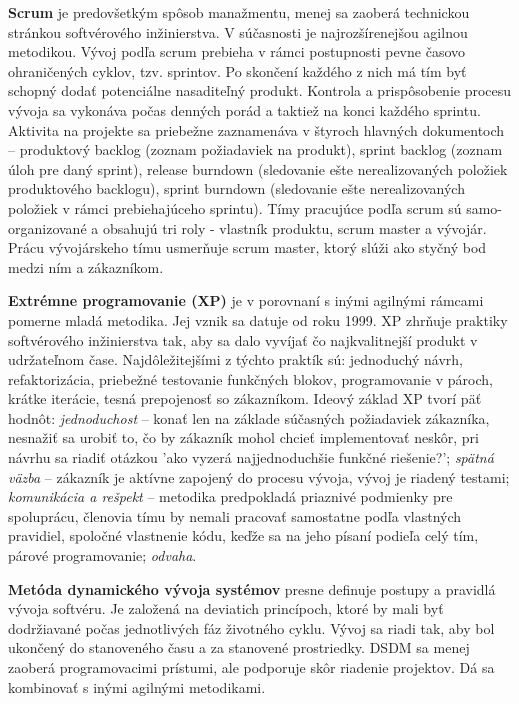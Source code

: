 \documentclass[10pt,twoside,slovak,a4paper]{article}
\begin{document}
\textbf{Scrum} je predovšetkým spôsob manažmentu, menej sa zaoberá technickou stránkou softvérového inžinierstva. V súčasnosti je najrozšírenejšou agilnou metodikou\cite{agile}. Vývoj podľa scrum prebieha v rámci postupnosti pevne časovo ohraničených cyklov, tzv. sprintov. Po skončení každého z nich má tím byť schopný dodať potenciálne nasaditeľný produkt. Kontrola a prispôsobenie procesu vývoja sa vykonáva počas denných porád a taktiež na konci každého sprintu. Aktivita na projekte sa priebežne zaznamenáva v štyroch hlavných dokumentoch – produktový backlog (zoznam požiadaviek na produkt), sprint backlog (zoznam úloh pre daný sprint), release burndown (sledovanie ešte nerealizovaných položiek produktového backlogu), sprint burndown (sledovanie ešte nerealizovaných položiek v rámci prebiehajúceho sprintu).
Tímy pracujúce podľa scrum sú samo-organizované a obsahujú tri roly - vlastník produktu, scrum master a vývojár. Prácu vývojárskeho tímu usmerňuje scrum master, ktorý slúži ako styčný bod medzi ním a zákazníkom\cite{scrum}.

\textbf{Extrémne programovanie (XP)} je v porovnaní s inými agilnými rámcami pomerne mladá metodika. Jej vznik sa datuje od roku 1999. XP zhrňuje praktiky softvérového inžinierstva tak, aby sa dalo vyvíjať čo najkvalitnejší produkt v udržateľnom čase. Najdôležitejšími z týchto praktík sú: jednoduchý návrh, refaktorizácia, priebežné testovanie funkčných blokov, programovanie v pároch, krátke iterácie, tesná prepojenosť so zákazníkom. Ideový základ XP tvorí päť hodnôt: \emph{jednoduchost} – konať len na základe súčasných požiadaviek zákazníka, nesnažiť sa urobiť to, čo by zákazník mohol chcieť implementovať neskôr, pri návrhu sa riadiť otázkou 'ako vyzerá najjednoduchšie funkčné riešenie?'; \emph{spätná väzba} – zákazník je aktívne zapojený do procesu vývoja, vývoj je riadený testami; \emph{komunikácia a rešpekt} – metodika predpokladá priaznivé podmienky pre spoluprácu, členovia tímu by nemali pracovať samostatne podľa vlastných pravidiel, spoločné vlastnenie kódu, keďže sa na jeho písaní podieľa celý tím, párové programovanie; \emph{odvaha}.

\textbf{Metóda dynamického vývoja systémov} presne definuje postupy a pravidlá vývoja softvéru. Je založená na deviatich princípoch, ktoré by mali byť dodržiavané počas jednotlivých fáz životného cyklu. Vývoj sa riadi tak, aby bol ukončený do stanoveného času a za stanovené prostriedky. DSDM sa menej zaoberá programovacimi prístumi, ale podporuje skôr riadenie projektov. Dá sa kombinovať s inými agilnými metodikami.
\end{document}
